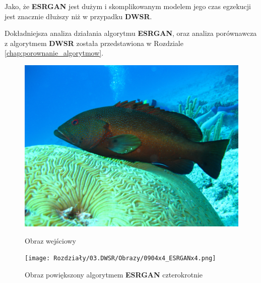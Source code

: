 Jako, że \textbf{ESRGAN} jest dużym i skomplikowanym modelem jego czas egzekucji jest znacznie dłuższy niż w przypadku \textbf{DWSR}. 

Dokładniejsza analiza działania algorytmu \textbf{ESRGAN}, oraz analiza porównawcza z algorytmem \textbf{DWSR} została przedstawiona w Rozdziale \ref{chap:porownanie_algorytmow}.


\begin{figure}[ht]
    \centering
    \begin{minipage}[t]{0.45\linewidth}
        \includegraphics[width=\linewidth]{Rozdziały/03.DWSR/Obrazy/0904x4.png}
        \caption{Obraz wejściowy}
        \label{fig:image67}
    \end{minipage}
    \hspace{0.5cm}
    \begin{minipage}[t]{0.45\linewidth}
        \texttt{[image: Rozdziały/03.DWSR/Obrazy/0904x4\_ESRGANx4.png]}
        \caption{Obraz powiększony algorytmem \textbf{ESRGAN} czterokrotnie}
        \label{fig:image68}
    \end{minipage}
\end{figure}


